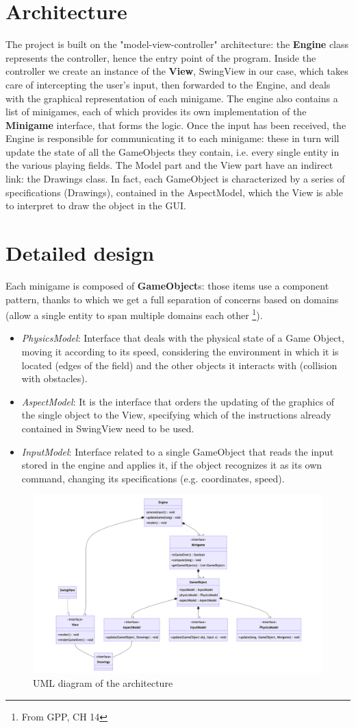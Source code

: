\documentclass[a4paper,12pt]{report}
\begin{document}
\section{Architecture}
The project is built on the "model-view-controller" architecture: the \textbf{Engine} class represents the controller, hence the entry point of the program.
Inside the controller we create an instance of the \textbf{View}, SwingView in our case, which takes care of intercepting the user's input, then forwarded to the Engine,
and deals with the graphical representation of each minigame. The engine also contains a list of minigames, each of which provides its own implementation of the \textbf{Minigame} interface, that forms the logic.
Once the input has been received, the Engine is responsible for communicating it to each minigame: these in turn will update the state of all the GameObjects they contain, i.e. every single entity in the various playing fields.
The Model part and the View part have an indirect link: the Drawings class. In fact, each GameObject is characterized by a series of specifications (Drawings), contained in the AspectModel, which the View is able to interpret 
to draw the object in the GUI.

\section{Detailed design}
Each minigame is composed of \textbf{GameObject}s: those items use a component pattern, thanks to which we get 
a full separation of concerns based on domains (allow a single entity to span multiple domains each other \footnote{From GPP, CH 14}).
\pagebreak
\begin{itemize}
	\item \textit{PhysicsModel}: Interface that deals with the physical state of a Game Object,
	moving it according to its speed, considering the environment in which it is located (edges of the field) 
	and the other objects it interacts with (collision with obstacles).
	\item \textit{AspectModel}: It is the interface that orders the updating of the graphics of the single 
	object to the View, specifying which of the instructions already contained in SwingView need to be used.
	\item \textit{InputModel}: Interface related to a single GameObject that reads the input stored in the 
	engine and applies it, if the object recognizes it as its own command, changing its specifications (e.g. coordinates, speed).
\end{itemize}

\begin{figure}[ht]
	\centering{}
	\includegraphics[width=\textwidth]{architecture.png}
	\caption{UML diagram of the architecture}
\end{figure}
\end{document}
